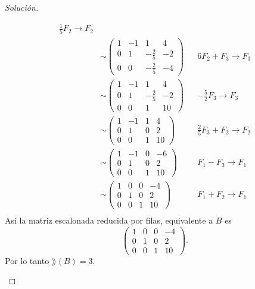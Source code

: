 \documentclass[a4,11pt]{aleph-notas}
\begin{document}
\begin{proof}[Solución]
\begin{enumerate}
\begin{align*}
            \frac{1}{5}F_2 \to F_2\\    
            & \sim 
            \begin{pmatrix}
            1 & -1 & 1 & 4\\
            0 & 1 & -\frac{2}{5} & -2\\
            0 & 0 & -\frac{2}{5} & -4
            \end{pmatrix} &&
            6F_2 + F_3 \to F_3\\       
            & \sim 
            \begin{pmatrix}
            1 & -1 & 1 & 4\\
            0 & 1 & -\frac{2}{5} & -2\\
            0 & 0 & 1 & 10
            \end{pmatrix} &&
            -\frac{5}{2}F_3 \to F_3\\    
            & \sim 
            \begin{pmatrix}
            1 & -1 & 1 & 4\\
            0 & 1 & 0 & 2\\
            0 & 0 & 1 & 10
            \end{pmatrix} &&
            \frac{2}{5}F_3  + F_2 \to F_2\\     
            & \sim 
            \begin{pmatrix}
            1 & -1 & 0 & -6\\
            0 & 1 & 0 & 2\\
            0 & 0 & 1 & 10
            \end{pmatrix} &&
            F_1  - F_3 \to F_1\\
            & \sim 
            \begin{pmatrix}
            1 & 0 & 0 & -4\\
            0 & 1 & 0 & 2\\
            0 & 0 & 1 & 10
            \end{pmatrix} &&
            F_1  + F_2 \to F_1\\
        \end{align*}
    Así la matriz escalonada reducida por filas, equivalente a $B$ es
        \[
            \begin{pmatrix}
            1 & 0 & 0 & -4\\
            0 & 1 & 0 & 2\\
            0 & 0 & 1 & 10
            \end{pmatrix} .   
        \]
    Por lo tanto $\rang(B)=3$.

\end{enumerate}
\end{proof}
\end{document}
